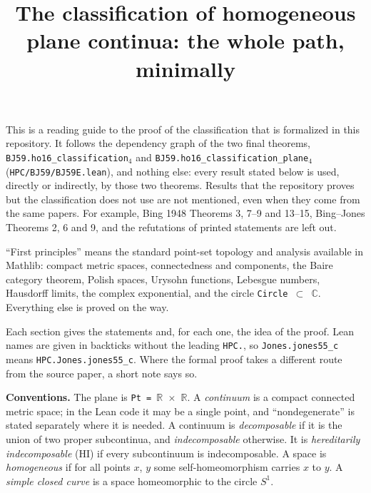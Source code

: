\documentclass[11pt]{article}
\title{The classification of homogeneous plane continua: the whole path, minimally}
\author{}
\date{}
\newcommand{\lean}[1]{\texttt{#1}}
\begin{document}
\maketitle

This is a reading guide to the proof of the classification that is formalized in this repository. It follows the dependency graph of the two final theorems, \lean{BJ59.\hspace{0pt}ho16\_\hspace{0pt}classification$_{4}$} and \lean{BJ59.\hspace{0pt}ho16\_\hspace{0pt}classification\_\hspace{0pt}plane$_{4}$} (\lean{HPC/BJ59/BJ59E.\hspace{0pt}lean}), and nothing else: every result stated below is used, directly or indirectly, by those two theorems. Results that the repository proves but the classification does not use are not mentioned, even when they come from the same papers. For example, Bing 1948 Theorems 3, 7--9 and 13--15, Bing--Jones Theorems 2, 6 and 9, and the refutations of printed statements are left out.

``First principles'' means the standard point-set topology and analysis available in Mathlib: compact metric spaces, connectedness and components, the Baire category theorem, Polish spaces, Urysohn functions, Lebesgue numbers, Hausdorff limits, the complex exponential, and the circle \lean{Circle $\subset$ $\mathbb{C}$}. Everything else is proved on the way.

Each section gives the statements and, for each one, the idea of the proof. Lean names are given in backticks without the leading \lean{HPC.\hspace{0pt}}, so \lean{Jones.\hspace{0pt}jones55\_\hspace{0pt}c} means \lean{HPC.\hspace{0pt}Jones.\hspace{0pt}jones55\_\hspace{0pt}c}. Where the formal proof takes a different route from the source paper, a short note says so.

\textbf{Conventions.} The plane is \lean{Pt = $\mathbb{R}$ $\times$ $\mathbb{R}$}. A \emph{continuum} is a compact connected metric space; in the Lean code it may be a single point, and ``nondegenerate'' is stated separately where it is needed. A continuum is \emph{decomposable} if it is the union of two proper subcontinua, and \emph{indecomposable} otherwise. It is \emph{hereditarily indecomposable} (HI) if every subcontinuum is indecomposable. A space is \emph{homogeneous} if for all points $x$, $y$ some self-homeomorphism carries $x$ to $y$. A \emph{simple closed curve} is a space homeomorphic to the circle $S^1$.
\end{document}
